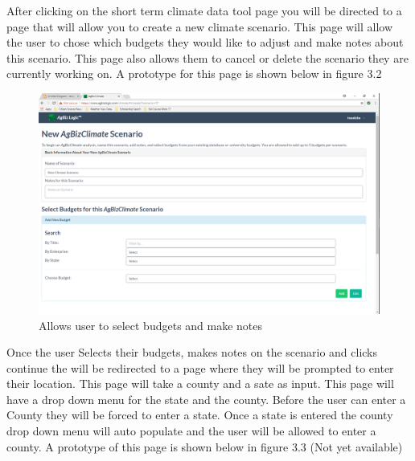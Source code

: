 \documentclass[onecolumn, draftclsnofoot,10pt, compsoc]{article}
\begin{document}
					After clicking on the short term climate data tool page you will be directed to a page that will allow you to create a new climate scenario. This page will allow the user to chose which budgets they would like to adjust and make notes about this scenario. This page also allows them to cancel or delete the scenario they are currently working on. A prototype for this page is shown below in figure 3.2\\
					
					\begin{figure}
					
						\includegraphics[width=\linewidth]{Figures/ClimateScenario.PNG}
						\caption{Allows user to select budgets and make notes}
						\label{figure3.2}
						
					\end{figure}

					Once the user Selects their budgets, makes notes on the scenario and clicks continue the will be redirected to a page where they will be prompted to enter their location. This page will take a county and a sate as input. This page will have a drop down menu for the state and the county. Before the user can enter a County they will be forced to enter a state. Once a state is entered the county drop down menu will auto populate and the user will be allowed to enter a county. A prototype of this page is shown below in figure 3.3 (Not yet available)\\
					
\end{document}
